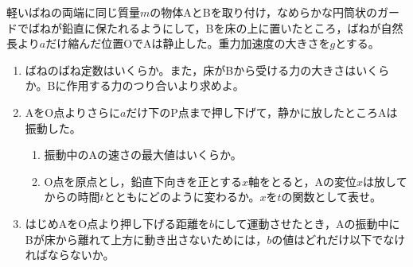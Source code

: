 \hakosyokika
\item
    \begin{mawarikomi}{50pt}{}
        軽いばねの両端に同じ質量$m$の物体AとBを取り付け，なめらかな円筒状のガードでばねが鉛直に保たれるようにして，Bを床の上に置いたところ，ばねが自然長より$a$だけ縮んだ位置OでAは静止した。重力加速度の大きさを$g$とする。
        \begin{enumerate}
            \item ばねのばね定数はいくらか。また，床がBから受ける力の大きさはいくらか。Bに作用する力のつり合いより求めよ。
            \item AをO点よりさらに$a$だけ下のP点まで押し下げて，静かに放したところAは振動した。
                \begin{enumerate}
                    \item 振動中のAの速さの最大値はいくらか。
                    \item O点を原点とし，鉛直下向きを正とする$x$軸をとると，Aの変位$x$は放してからの時間$t$とともにどのように変わるか。$x$を$t$の関数として表せ。
                \end{enumerate}
            \item はじめAをO点より押し下げる距離を$b$にして運動させたとき，Aの振動中にBが床から離れて上方に動き出さないためには，$b$の値はどれだけ以下でなければならないか。
        \end{enumerate}
    \end{mawarikomi}